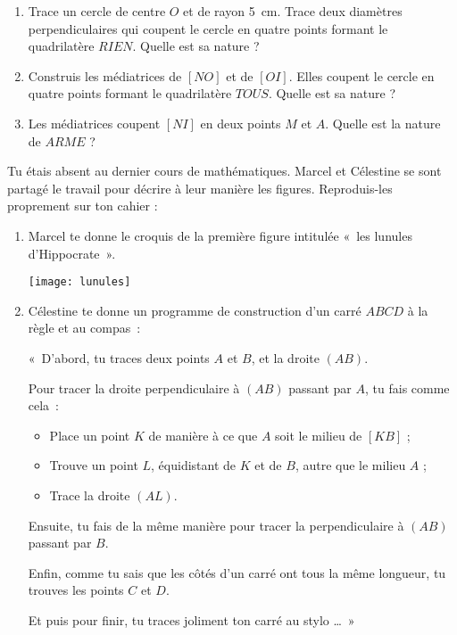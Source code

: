 \begin{exercice}
\begin{enumerate}
 \item Trace un cercle de centre $O$ et de rayon 5 cm. Trace deux diamètres perpendiculaires qui coupent le cercle en quatre points formant le quadrilatère $RIEN$. Quelle est sa nature ?
 \item Construis les médiatrices de $[NO]$ et de $[OI]$. Elles coupent le cercle en quatre points formant le quadrilatère $TOUS$. Quelle est sa nature ?
 \item Les médiatrices coupent $[NI]$ en deux points $M$ et $A$. Quelle est la nature de $ARME$ ?
 \end{enumerate}
\end{exercice}


\begin{exercice}
Tu étais absent au dernier cours de mathématiques. Marcel et Célestine se sont partagé le travail pour décrire à leur manière les figures. Reproduis-les proprement sur ton cahier :
\begin{enumerate}
 \item Marcel te donne le croquis de la première figure intitulée « les lunules d'Hippocrate ».
 \begin{center} \texttt{[image: lunules]} \end{center}
 \item Célestine te donne un programme de construction d'un carré $ABCD$ à la règle et au compas :
 
« D'abord, tu traces deux points $A$ et $B$, et la droite $(AB)$.

Pour tracer la droite perpendiculaire à $(AB)$ passant par $A$, tu fais comme cela :
 \begin{itemize}
  \item Place un point $K$ de manière à ce que $A$ soit le milieu de $[KB]$ ;
  \item Trouve un point $L$, équidistant de $K$ et de $B$, autre que le milieu $A$ ;
  \item Trace la droite $(AL)$.
  \end{itemize}
Ensuite, tu fais de la même manière pour tracer la perpendiculaire à $(AB)$ passant par $B$.
  
Enfin, comme tu sais que les côtés d'un carré ont tous la même longueur, tu trouves les points $C$ et $D$.

Et puis pour finir, tu traces joliment ton carré au stylo … »

 \end{enumerate}
\end{exercice}


